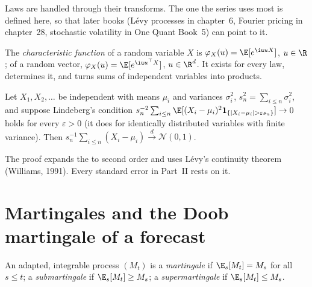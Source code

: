 Laws are handled through their transforms. The one the series uses most is defined here, so
that later books (Lévy processes in chapter~6, Fourier pricing in chapter~28, stochastic
volatility in One Quant Book~5) can point to it.

\begin{definition}\label{def:qm:probability-at-speed:charfn}
The \emph{characteristic function} of a random variable $X$
is $\varphi_X(u) = \E[e^{\iu uX}]$, $u \in \R$; of a random vector, $\varphi_X(u) =
\E[e^{\iu u^\top X}]$, $u \in \R^d$. It exists for every law, determines it, and turns sums
of independent variables into products.
\end{definition}

\begin{theorem}\label{thm:qm:probability-at-speed:clt}
Let $X_1, X_2, \dots$ be independent with means $\mu_i$ and variances $\sigma_i^2$, $s_n^2 =
\sum_{i \le n}\sigma_i^2$, and suppose Lindeberg's condition $s_n^{-2}\sum_{i\le n}\E[(X_i -
\mu_i)^2\mathbf 1_{\{|X_i - \mu_i| > \varepsilon s_n\}}] \to 0$ holds for every $\varepsilon >
0$ (it does for identically distributed variables with finite variance). Then
$s_n^{-1}\sum_{i \le n}(X_i - \mu_i) \xrightarrow{d} \mathcal N(0, 1)$.
\end{theorem}

\admitted

The proof expands the  to second order and uses Lévy's continuity
theorem (Williams, 1991). Every standard error in Part~II rests on it.

\section{Martingales and the Doob martingale of a forecast}

\begin{definition}[Martingale]\label{def:qm:probability-at-speed:martingale}
An adapted, integrable process $(M_t)$ is a \emph{martingale} if
$\E_s[M_t] = M_s$ for all $s \le t$; a \emph{submartingale} if
$\E_s[M_t] \ge M_s$; a \emph{supermartingale} if $\E_s[M_t] \le
M_s$.
\end{definition}

